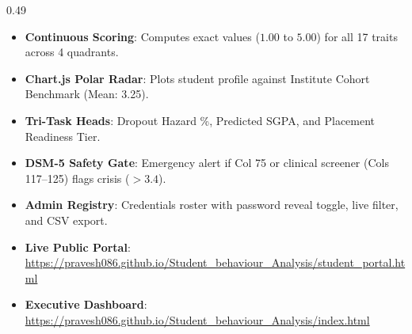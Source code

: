 \documentclass[aspectratio=169, 10pt]{beamer}
\begin{document}
\begin{frame}[t]
\begin{columns}[T]
    \begin{column}{0.49\textwidth}
      \begin{tcolorbox}[colback=white, colframe=BluePrimary, arc=1.2mm, boxrule=0.8pt, title={\scriptsize\bfseries\color{white}3. 17-Trait Valuation \& Kundali Radar}, colbacktitle=BluePrimary]
        \fontsize{5.0pt}{6.0pt}\selectfont
        \begin{itemize}\setlength{\itemsep}{2pt}
          \item \textbf{Continuous Scoring}: Computes exact values ($1.00$ to $5.00$) for all 17 traits across 4 quadrants.
          \item \textbf{Chart.js Polar Radar}: Plots student profile against Institute Cohort Benchmark (Mean: 3.25).
          \item \textbf{Tri-Task Heads}: Dropout Hazard \%, Predicted SGPA, and Placement Readiness Tier.
          \item \textbf{DSM-5 Safety Gate}: Emergency alert if Col 75 or clinical screener (Cols 117--125) flags crisis ($>3.4$).
        \end{itemize}
      \end{tcolorbox}
      \vspace{1mm}
      \begin{tcolorbox}[colback=white, colframe=BlueDeep, arc=1.2mm, boxrule=0.8pt, title={\scriptsize\bfseries\color{white}4. Admin Audit Center \& Live Web URLs}, colbacktitle=BlueDeep]
        \fontsize{5.0pt}{6.0pt}\selectfont
        \begin{itemize}\setlength{\itemsep}{2pt}
          \item \textbf{Admin Registry}: Credentials roster with password reveal toggle, live filter, and CSV export.
          \item \textbf{Live Public Portal}:\\
          \tiny\url{https://pravesh086.github.io/Student_behaviour_Analysis/student_portal.html}
          \item \textbf{Executive Dashboard}:\\
          \tiny\url{https://pravesh086.github.io/Student_behaviour_Analysis/index.html}
        \end{itemize}
      \end{tcolorbox}
    \end{column}
  \end{columns}
\end{frame}
\end{document}
